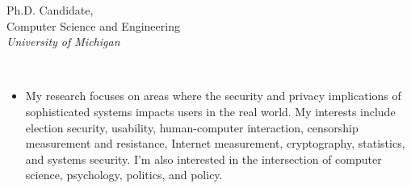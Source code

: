 \documentclass[11pt]{article}
\begin{document}
\fancyhead{}
\fancyfoot[F]{\hfill\small\thepage}
\renewcommand{\headrulewidth}{0pt}
\pagestyle{fancy}\thispagestyle{fancy}
\newcommand{\cvsection}[1]{{\vspace{8pt}{\Large\bf #1}}}
\newdimen{\leftsize}
\newdimen{\rightsize}
\leftsize=0.5in
\rightsize=5.5in
\parindent=0pt
\setlength{\leftmargini}{\leftsize}
\addtolength{\leftmargini}{3pt}
\renewcommand{\labelenumi}{[\arabic{enumi}]}
\def\textsb#1{{\fontseries{sb}\selectfont #1}}

\newif\ifsocial\socialfalse
{\parbox[b]{3.55in}{
\fontsize{18pt}{22pt}\selectfont
\textbf{}\vspace{2pt}

\setlength\leftskip{0pt}\setlength\rightskip{-\leftskip}\setlength\parfillskip{\leftskip}
\raggedright

\fontsize{12pt}{16pt}\selectfont
Ph.D. Candidate,\\
Computer Science and Engineering\\
{\textsl{University of Michigan}}
}}
\hfill
{\parbox[b]{2.0in}{\raggedleft\fontsize{10pt}{12pt}\selectfont
{}\\
\vspace{1pt}
}

\vspace{8pt}

{\fontsize{12pt}{16pt}\selectfont
    \textls[20]{{\today}}\hfill
{}
}
}

\normalsize\selectfont
\smallskip


\vspace*{8pt}


\cvsection{Research Overview}
\vspace{-2pt}

\begin{itemize}[label={},leftmargin=0.25in,labelsep=0pt]\addtolength{\itemsep}{-0.25\baselineskip}

\item My research focuses on areas where the security and privacy implications of sophisticated systems impacts users in the real world. My interests include election security, usability, human-computer interaction, censorship measurement and resistance, Internet measurement, cryptography, statistics, and systems security. I'm also interested in the intersection of computer science, psychology, politics, and policy.

\end{itemize}
\end{document}
